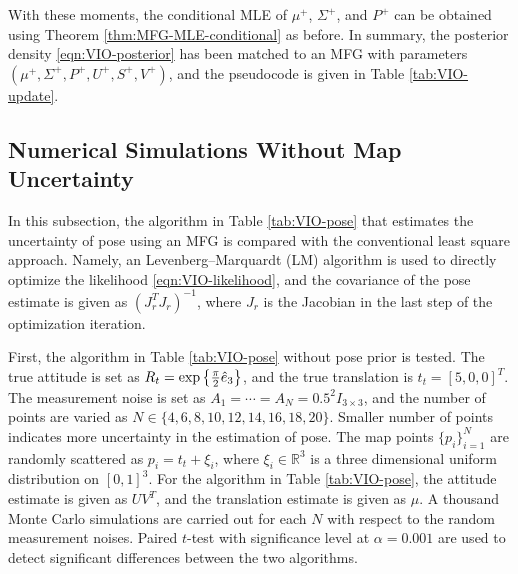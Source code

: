 With these moments, the conditional MLE of $\mu^+$, $\Sigma^+$, and $P^+$ can be obtained using Theorem \ref{thm:MFG-MLE-conditional} as before.
In summary, the posterior density \eqref{eqn:VIO-posterior} has been matched to an MFG with parameters $(\mu^+,\Sigma^+,P^+,U^+,S^+,V^+)$, and the pseudocode is given in Table \ref{tab:VIO-update}.

\subsection{Numerical Simulations Without Map Uncertainty} \label{section:VIO-simulation}

In this subsection, the algorithm in Table \ref{tab:VIO-pose} that estimates the uncertainty of pose using an MFG is compared with the conventional least square approach.
Namely, an Levenberg–Marquardt (LM) algorithm is used to directly optimize the likelihood \eqref{eqn:VIO-likelihood}, and the covariance of the pose estimate is given as $(J_r^TJ_r)^{-1}$, where $J_r$ is the Jacobian in the last step of the optimization iteration.

First, the algorithm in Table \ref{tab:VIO-pose} without pose prior is tested.
The true attitude is set as $R_t = \exp\left\{ \tfrac{\pi}{2}\hat{e}_3 \right\}$, and the true translation is $t_t = [5,0,0]^T$.
The measurement noise is set as $A_1 = \cdots = A_N = 0.5^2I_{3\times 3}$, and the number of points are varied as $N\in\{4,\allowbreak 6,\allowbreak 8,\allowbreak 10,\allowbreak 12,\allowbreak 14,\allowbreak 16,\allowbreak 18,\allowbreak 20\}$.
Smaller number of points indicates more uncertainty in the estimation of pose.
The map points $\{p_i\}_{i=1}^N$ are randomly scattered as $p_i = t_t + \xi_i$, where $\xi_i\in\mathbb{R}^3$ is a three dimensional uniform distribution on $[0,1]^3$.
For the algorithm in Table \ref{tab:VIO-pose}, the attitude estimate is given as $UV^T$, and the translation estimate is given as $\mu$.
A thousand Monte Carlo simulations are carried out for each $N$ with respect to the random measurement noises.
Paired $t$-test with significance level at $\alpha = 0.001$ are used to detect significant differences between the two algorithms.

